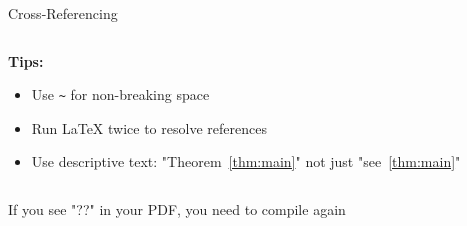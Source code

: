 \begin{frame}[fragile]{Cross-Referencing}
\begin{columns}
\begin{column}{0.5\textwidth}
               \textbf{Tips:}
               \begin{itemize}
                    \item Use \texttt{\textasciitilde} for non-breaking space
                    \item Run LaTeX twice to resolve references
                    \item Use descriptive text: "Theorem~\ref{thm:main}" not just "see~\ref{thm:main}"
               \end{itemize}
          \end{column}
     \end{columns}
     
     \begin{warning}
          If you see "??" in your PDF, you need to compile again
     \end{warning}
\end{frame}

